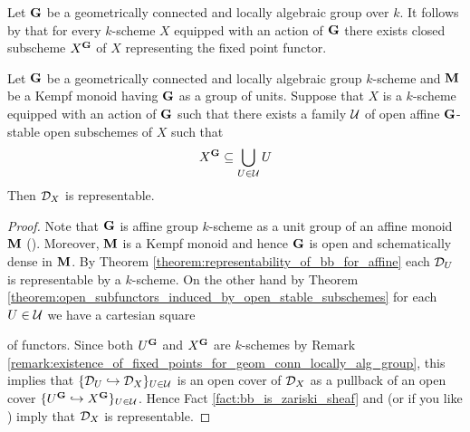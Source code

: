 \begin{remark}\label{remark:existence_of_fixed_points_for_geom_conn_locally_alg_group}
Let $\mathbf{G}$ be a geometrically connected and locally algebraic group over $k$. It follows by {\cite[Theorem 7.2]{Group_schemes_over_field}} that for every $k$-scheme $X$ equipped with an action of $\mathbf{G}$ there exists closed subscheme $X^{\mathbf{G}}$ of $X$ representing the fixed point functor.
\end{remark}

\begin{corollary}\label{corollary:bb_is_representable_on_schemes_with_affine_cover_of_fixed_points}
Let $\mathbf{G}$ be a geometrically connected and locally algebraic group $k$-scheme and $\mathbf{M}$ be a Kempf monoid having $\mathbf{G}$ as a group of units. Suppose that $X$ is a $k$-scheme equipped with an action of $\mathbf{G}$ such that there exists a family ${\mathcal U}$ of open affine $\mathbf{G}$-stable open subschemes of $X$ such that
$$X^{\mathbf{G}}\subseteq \bigcup_{U\in {\mathcal U}}U$$
Then ${\mathcal D}_X$ is representable.
\end{corollary}
\begin{proof}
Note that $\mathbf{G}$ is affine group $k$-scheme as a unit group of an affine monoid $\mathbf{M}$ ({\cite[Proposition 12.4]{Monoid_k_functors}}). Moreover, $\mathbf{M}$ is a Kempf monoid and hence $\mathbf{G}$ is open and schematically dense in $\mathbf{M}$. By Theorem \ref{theorem:representability_of_bb_for_affine} each ${\mathcal D}_U$ is representable by a $k$-scheme. On the other hand by Theorem \ref{theorem:open_subfunctors_induced_by_open_stable_subschemes} for each $U\in {\mathcal U}$ we have a cartesian square
\begin{center}
\end{center}
of functors. Since both $U^{\mathbf{G}}$ and $X^{\mathbf{G}}$ are $k$-schemes by Remark \ref{remark:existence_of_fixed_points_for_geom_conn_locally_alg_group}, this implies that $\{{\mathcal D}_U\hookrightarrow {\mathcal D}_X\}_{U\in {\mathcal U}}$ is an open cover of ${\mathcal D}_X$ as a pullback of an open cover $\{U^{\mathbf{G}}\hookrightarrow X^{\mathbf{G}}\}_{U\in {\mathcal U}}$. Hence Fact \ref{fact:bb_is_zariski_sheaf} and {\cite[Theorem 8.9]{gortz2010algebraic}} (or if you like {\cite[Theorem 4.6]{kfunctors}}) imply that ${\mathcal D}_X$ is representable. 
\end{proof}


